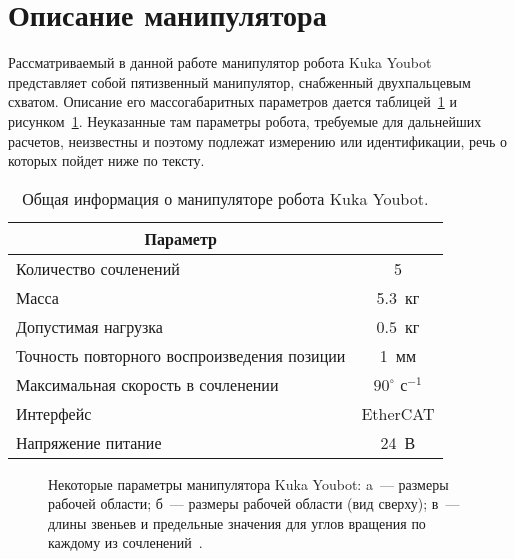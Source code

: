 \section{Описание манипулятора}\label{part_description_of_robot}
Рассматриваемый в данной работе манипулятор робота Kuka Youbot представляет собой пятизвенный манипулятор, снабженный двухпальцевым схватом.
Описание его массогабаритных параметров дается таблицей~\ref{table_gen_info_of_manipulator} и рисунком~\ref{img:sizes_of_robot}.
Неуказанные там параметры робота, требуемые для дальнейших расчетов, неизвестны и поэтому подлежат измерению или идентификации, речь о которых пойдет ниже по тексту.

\begin{table}[h!]
	\caption{Общая информация о манипуляторе робота Kuka Youbot.}
	\begin{center}
		\begin{tabular}{|l|c|}
			\hline
			\multicolumn{1}{|c|}{Параметр} & \makebox[3cm]{Значение}\\
			\hline
			Количество сочленений & 5\\
			\hline
			Масса & 5.3~кг\\
			\hline
			Допустимая нагрузка & $0.5$~кг\\
			\hline
			Точность повторного воспроизведения позиции & 1~мм\\
			\hline
			Максимальная скорость в сочленении & $90^\circ\text{ с}^{-1}$\\
			\hline
			Интерфейс & EtherCAT\\
			\hline
			Напряжение питание & 24~В\\
			\hline
		\end{tabular}
	\end{center}
	\label{table_gen_info_of_manipulator}
\end{table}


\begin{figure}[p]
    \vfill
	\begin{minipage}[h]{0.47\linewidth}
	\end{minipage}
	\hfill
	\begin{minipage}[h]{0.47\linewidth}
	\end{minipage}
	\caption{Некоторые параметры манипулятора Kuka Youbot: a~--- размеры рабочей области; б~--- размеры рабочей области (вид сверху); в~--- длины звеньев и предельные значения для углов вращения по каждому из сочленений~\cite{youbot_detailed_specifications}.}
	\label{img:sizes_of_robot}
\end{figure}

\newpage